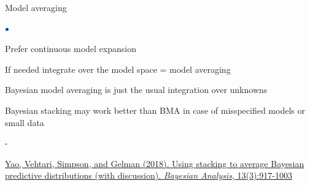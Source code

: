 \documentclass[english,t]{beamer}
\newenvironment{list1}{
   \begin{list}{$\color{list1}\bullet$}{\itemsep=6pt}}{
  \end{list}}
\newenvironment{list2}{
  \begin{list}{-}{\baselineskip=12pt\itemsep=2pt}}{
  \end{list}}
\begin{document}




\begin{frame}{Model averaging}
  
  \begin{list1}
  \item<+-> Prefer continuous model expansion
  \item<+-> If needed integrate over the model space = model averaging
  \item<+-> Bayesian model averaging is just the usual integration
    over unknowns
  \item<+-> Bayesian stacking may work better than BMA in case of
    misspecified models or small data
    \begin{list2}
    \item \href{https://projecteuclid.org/euclid.ba/1516093227}{Yao, Vehtari, Simpson, and Gelman (2018). Using stacking to average Bayesian predictive distributions (with discussion). \textit{Bayesian Analysis}, 13(3):917-1003}
    \end{list2}
  \end{list1}
  
\end{frame}
\end{document}
